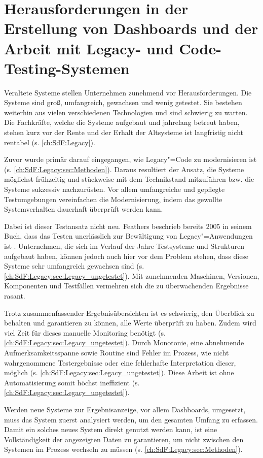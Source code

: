 \section{Herausforderungen in der Erstellung von Dash\-boards und der Arbeit mit Legacy- und Code-Testing-Systemen}
\label{ch:Problem:Gesamt}

Veraltete Systeme stellen Unternehmen zunehmend vor Herausforderungen. Die Systeme sind groß, umfangreich, gewachsen und wenig getestet. Sie bestehen weiterhin aus vielen verschiedenen Technologien und sind schwierig zu warten. Die Fachkräfte, welche die Systeme aufgebaut und jahrelang betreut haben, stehen kurz vor der Rente und der Erhalt der Altsysteme ist langfristig nicht rentabel (s. \autoref{ch:SdF:Legacy}).

Zuvor wurde primär darauf eingegangen, wie Legacy"=Code zu modernisieren ist (s. \autoref{ch:SdF:Legacy:sec:Methoden}). Daraus resultiert der Ansatz, die Systeme möglichst frühzeitig und stückweise mit dem Technikstand mitzuführen bzw. die Systeme sukzessiv nachzurüsten. Vor allem umfangreiche und gepflegte Testumgebungen vereinfachen die Modernisierung, indem das gewollte Systemverhalten dauerhaft überprüft werden kann.

Dabei ist dieser Testansatz nicht neu. Feathers beschrieb bereits 2005 in seinem Buch, dass das Testen unerlässlich zur Bewältigung von Legacy"=Anwendungen ist \cite[S. 45]{Feathers:2013}. Unternehmen, die sich im Verlauf der Jahre Testsysteme und Strukturen aufgebaut haben, können jedoch auch hier vor dem Problem stehen, dass diese Systeme sehr umfangreich gewachsen sind (s. \autoref{ch:SdF:Legacy:sec:Legacy_ungetestet}). Mit zunehmenden Maschinen, Versionen, Komponenten und Testfällen vermehren sich die zu überwachenden Ergebnisse rasant.

Trotz zusammenfassender Ergebnisübersichten ist es schwierig, den Überblick zu behalten und garantieren zu können, alle Werte überprüft zu haben. Zudem wird viel Zeit für dieses manuelle Monitoring benötigt (s. \autoref{ch:SdF:Legacy:sec:Legacy_ungetestet}). Durch Monotonie, eine abnehmende Aufmerksamkeitsspanne sowie Routine sind Fehler im Prozess, wie nicht wahrgenommene Testergebnisse oder eine fehlerhafte Interpretation dieser, möglich (s. \autoref{ch:SdF:Legacy:sec:Legacy_ungetestet}). Diese Arbeit ist ohne Automatisierung somit höchst ineffizient (s. \autoref{ch:SdF:Legacy:sec:Legacy_ungetestet}).

Werden neue Systeme zur Ergebnisanzeige, vor allem Dash\-boards, umgesetzt, muss das System zuerst analysiert werden, um den gesamten Umfang zu erfassen. Damit ein solches neues System direkt genutzt werden kann, ist eine Vollständigkeit der angezeigten Daten zu garantieren, um nicht zwischen den Systemen im Prozess wechseln zu müssen (s. \autoref{ch:SdF:Legacy:sec:Methoden}).

